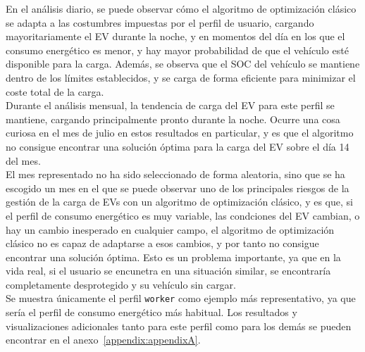 En el análisis diario, se puede observar cómo el algoritmo de optimización clásico se adapta a las
costumbres impuestas por el perfil de usuario, cargando mayoritariamente el EV durante la noche, y
en momentos del día en los que el consumo energético es menor, y hay mayor probabilidad de que el 
vehículo esté disponible para la carga. Además, se observa que el SOC del vehículo se mantiene
dentro de los límites establecidos, y se carga de forma eficiente para minimizar el coste total de
la carga.\\

Durante el análisis mensual, la tendencia de carga del EV para este perfil se mantiene, cargando
principalmente pronto durante la noche. Ocurre una cosa curiosa en el mes de julio en estos 
resultados en particular, y es que el algoritmo no consigue encontrar una solución óptima para
la carga del EV sobre el día 14 del mes.\\

El mes representado no ha sido seleccionado de forma aleatoria, sino que se ha escogido un mes en 
el que se puede observar uno de los principales riesgos de la gestión de la carga de EVs con un
algoritmo de optimización clásico, y es que, si el perfil de consumo energético es muy variable,
las condciones del EV cambian, o hay un cambio inesperado en cualquier campo, el algoritmo
de optimización clásico no es capaz de adaptarse a esos cambios, y por tanto no consigue encontrar
una solución óptima. Esto es un problema importante, ya que en la vida real, si el usuario se 
encunetra en una situación similar, se encontraría completamente desprotegido y su vehículo sin
cargar.\\

Se muestra únicamente el perfil \texttt{worker} como ejemplo más representativo, ya que sería el
perfil de consumo energético más habitual. Los resultados y visualizaciones adicionales tanto para
este perfil como para los demás se pueden encontrar en el anexo~\ref{appendix:appendixA}.\\

